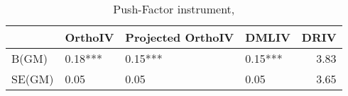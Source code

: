 \begin{table}\centering\caption{Push-Factor instrument, }\begin{tabular}{llllr}
\toprule
        & OrthoIV   & Projected OrthoIV   & DMLIV   &   DRIV \\
\midrule
 B(GM)  & 0.18***   & 0.15***             & 0.15*** &   3.83 \\
 SE(GM) & 0.05      & 0.05                & 0.05    &   3.65 \\
\bottomrule
\end{tabular}\end{table}